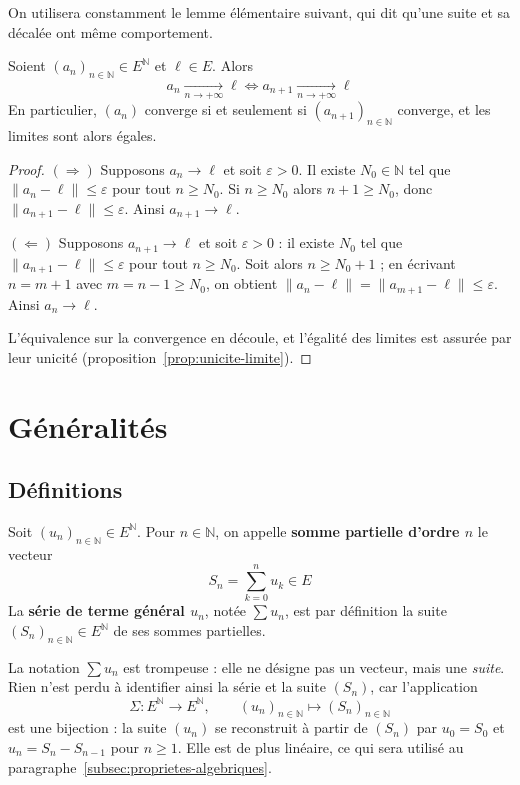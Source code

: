 On utilisera constamment le lemme élémentaire suivant, qui dit qu'une suite et sa décalée ont même comportement.

\begin{lemme}
\label{lemme:decalage}
Soient $(a_n)_{n\in\mathbb{N}}\in E^{\mathbb{N}}$ et $\ell\in E$. Alors
\[a_n\xrightarrow[n\to+\infty]{}\ell \iff a_{n+1}\xrightarrow[n\to+\infty]{}\ell\]
En particulier, $(a_n)$ converge si et seulement si $(a_{n+1})_{n\in\mathbb{N}}$ converge, et les limites sont alors égales.
\end{lemme}

\begin{proof}
$(\Rightarrow)$ Supposons $a_n\to\ell$ et soit $\varepsilon>0$. Il existe $N_0\in\mathbb{N}$ tel que $\|a_n-\ell\|\leq\varepsilon$ pour tout $n\geq N_0$. Si $n\geq N_0$ alors $n+1\geq N_0$, donc $\|a_{n+1}-\ell\|\leq\varepsilon$. Ainsi $a_{n+1}\to\ell$.

$(\Leftarrow)$ Supposons $a_{n+1}\to\ell$ et soit $\varepsilon>0$ : il existe $N_0$ tel que $\|a_{n+1}-\ell\|\leq\varepsilon$ pour tout $n\geq N_0$. Soit alors $n\geq N_0+1$ ; en écrivant $n=m+1$ avec $m=n-1\geq N_0$, on obtient $\|a_n-\ell\|=\|a_{m+1}-\ell\|\leq\varepsilon$. Ainsi $a_n\to\ell$.

L'équivalence sur la convergence en découle, et l'égalité des limites est assurée par leur unicité (proposition~\ref{prop:unicite-limite}).
\end{proof}

\section{Généralités}
\label{sec:generalites-series}

\subsection{Définitions}

\begin{defi}
\label{defi:serie}
Soit $(u_n)_{n\in\mathbb{N}}\in E^{\mathbb{N}}$. Pour $n\in\mathbb{N}$, on appelle \textbf{somme partielle d'ordre $n$} le vecteur
\[S_n = \sum_{k=0}^{n} u_k \in E\]
La \textbf{série de terme général $u_n$}, notée $\sum u_n$, est par définition la suite $(S_n)_{n\in\mathbb{N}}\in E^{\mathbb{N}}$ de ses sommes partielles.
\end{defi}

\begin{remarque}
La notation $\sum u_n$ est trompeuse : elle ne désigne pas un vecteur, mais une \emph{suite}. Rien n'est perdu à identifier ainsi la série et la suite $(S_n)$, car l'application
\[\Sigma : E^{\mathbb{N}}\longrightarrow E^{\mathbb{N}},\qquad (u_n)_{n\in\mathbb{N}}\longmapsto (S_n)_{n\in\mathbb{N}}\]
est une bijection : la suite $(u_n)$ se reconstruit à partir de $(S_n)$ par $u_0=S_0$ et $u_n=S_n-S_{n-1}$ pour $n\geq 1$. Elle est de plus linéaire, ce qui sera utilisé au paragraphe~\ref{subsec:proprietes-algebriques}.
\end{remarque}

